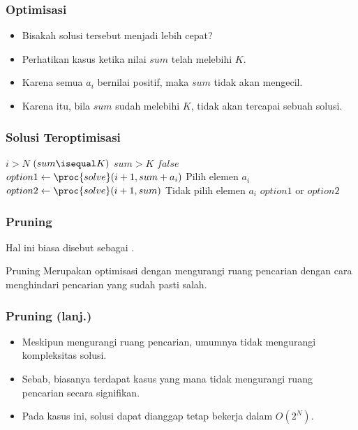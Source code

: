 \begin{frame}
\frametitle{Optimisasi}
\begin{itemize}
  \item Bisakah solusi tersebut menjadi lebih cepat?
  \item Perhatikan kasus ketika nilai $sum$ telah melebihi $K$.
  \item Karena semua $a_i$ bernilai positif, maka $sum$ tidak akan mengecil.
  \item Karena itu, bila $sum$ sudah melebihi $K$,  tidak akan tercapai sebuah solusi.
\end{itemize}
\end{frame}

\begin{frame}
\frametitle{Solusi Teroptimisasi}
\begin{codebox}
\li \If $i > N$ \Then
\li   \Return $(sum \isequal K)$
    \End
\zi
\li \If $sum > K$ \Then
\li   \Return $false$
    \End
\zi
\li $option1 \gets \proc{solve}(i+1, sum + a_i)$ \Comment Pilih elemen $a_i$
\li $option2 \gets \proc{solve}(i+1, sum)$ \Comment Tidak pilih elemen $a_i$
\li \Return $option1$ or $option2$
\end{codebox}
\end{frame}

\begin{frame}
\frametitle{Pruning}
Hal ini biasa disebut sebagai .
\begin{block}{Pruning}
  Merupakan optimisasi dengan mengurangi ruang pencarian dengan cara menghindari pencarian yang sudah pasti salah.
\end{block}
\end{frame}

\begin{frame}
\frametitle{Pruning (lanj.)}
\begin{itemize}
  \item Meskipun mengurangi ruang pencarian, \fpruning umumnya tidak mengurangi kompleksitas solusi.
  \item Sebab, biasanya terdapat kasus yang mana \fpruning tidak mengurangi ruang pencarian secara signifikan.
  \item Pada kasus ini, solusi dapat dianggap tetap bekerja dalam $O(2^N)$.
\end{itemize}
\end{frame}

